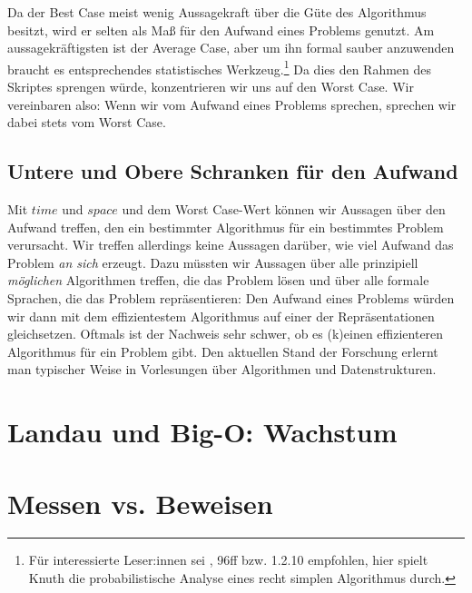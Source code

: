 Da der Best Case meist wenig Aussagekraft über die Güte des Algorithmus besitzt,
wird er selten als Maß für den Aufwand eines Problems genutzt.
Am aussagekräftigsten ist der Average Case,
aber um ihn formal sauber anzuwenden braucht es
entsprechendes statistisches Werkzeug.\footnote{
    Für interessierte Leser:innen sei \cite{knuth1}, 96ff bzw. 1.2.10 empfohlen,
    hier spielt Knuth die probabilistische Analyse eines recht simplen Algorithmus durch.} 
Da dies den Rahmen des Skriptes sprengen würde,
konzentrieren wir uns auf den Worst Case.
Wir vereinbaren also: Wenn wir vom Aufwand eines Problems sprechen,
sprechen wir dabei stets vom Worst Case.

\subsection{Untere und Obere Schranken für den Aufwand}
Mit $time$ und $space$ und dem Worst Case-Wert können wir Aussagen über den Aufwand treffen,
den ein bestimmter Algorithmus für ein bestimmtes Problem verursacht.
Wir treffen allerdings keine Aussagen darüber,
wie viel Aufwand das Problem \emph{an sich} erzeugt.
Dazu müssten wir Aussagen über alle prinzipiell \emph{möglichen} Algorithmen treffen,
die das Problem lösen
und über alle formale Sprachen, die das Problem repräsentieren:
Den Aufwand eines Problems würden wir dann mit dem effizientestem Algorithmus 
auf einer der Repräsentationen gleichsetzen.
Oftmals ist der Nachweis sehr schwer, ob es (k)einen effizienteren Algorithmus
für ein Problem gibt.
Den aktuellen Stand der Forschung erlernt man typischer Weise in Vorlesungen über
Algorithmen und Datenstrukturen.

\section{Landau und Big-O: Wachstum}
\section{Messen vs. Beweisen}\label{messenVsBeweisen}

